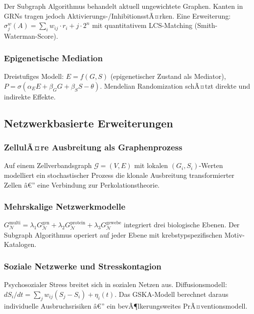 ﻿\documentclass[12pt, a4paper]{article}
\theoremstyle{definition}
\theoremstyle{remark}
\newcommand{\calG}{\mathcal{G}}
\newcommand{\calN}{\mathcal{N}}
\newcommand{\GN}{G_{\calN}}
\begin{document}
Der Subgraph Algorithmus behandelt aktuell ungewichtete Graphen. Kanten in GRNs
tragen jedoch Aktivierungs-/InhibitionsstÃ¤rken. Eine Erweiterung:
$\sigma_j^w(A) = \sum_i w_{ij} \cdot r_i + j \cdot 2^n$ mit
quantitativem LCS-Matching (Smith-Waterman-Score).

\subsubsection{Epigenetische Mediation}

Dreistufiges Modell: $E = f(G, S)$ (epigenetischer Zustand als Mediator),
$P = \sigma(\alpha_E E + \beta_G G + \beta_S S - \theta)$.
Mendelian Randomization schÃ¤tzt direkte und indirekte Effekte.

\subsection{Netzwerkbasierte Erweiterungen}

\subsubsection{ZellulÃ¤re Ausbreitung als Graphenprozess}

Auf einem Zellverbandsgraph $\calG = (V, E)$ mit lokalen $(G_i, S_i)$-Werten
modelliert ein stochastischer Prozess die klonale Ausbreitung transformierter Zellen â€”
eine Verbindung zur Perkolationstheorie.

\subsubsection{Mehrskalige Netzwerkmodelle}

$\GN^{\mathrm{multi}} = \lambda_1 G^\mathrm{gen}_\calN + \lambda_2 G^\mathrm{protein}_\calN
+ \lambda_3 G^\mathrm{gewebe}_\calN$ integriert drei biologische Ebenen.
Der Subgraph Algorithmus operiert auf jeder Ebene mit krebstypspezifischen
Motiv-Katalogen.

\subsubsection{Soziale Netzwerke und Stresskontagion}

Psychosozialer Stress breitet sich in sozialen Netzen aus. Diffusionsmodell:
$dS_i/dt = \sum_j w_{ij}(S_j - S_i) + \eta_i(t)$. Das GSKA-Modell berechnet
daraus individuelle Ausbruchsrisiken â€” ein bevÃ¶lkerungsweites PrÃ¤ventionsmodell.
\end{document}

